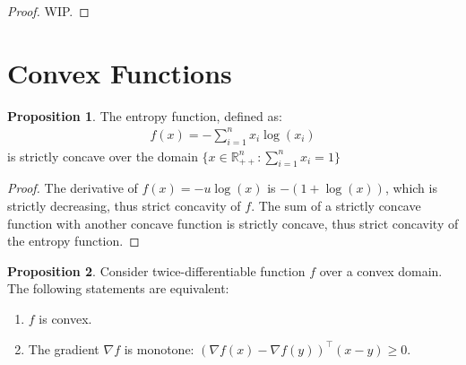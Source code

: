 \documentclass[12pt]{article}
\newcommand{\RR}{\mathbb{R}}
\theoremstyle{definition}
\newtheorem{prop}{Proposition}[section]
\begin{document}
	\begin{proof}
		WIP.
	\end{proof}
	
	\section{Convex Functions}
	
	\begin{prop}
		The entropy function, defined as:
		\begin{gather*}
			f(x) = -\sum^n_{i=1} x_i \log(x_i)
		\end{gather*}
		is strictly concave over the domain $\{x \in \RR^n_{++}: \sum^n_{i=1}x_i = 1\}$
	\end{prop}
	
	\begin{proof}
		The derivative of $f(x) = -u\log(x)$ is $-(1 + \log(x))$, which is strictly decreasing, thus strict concavity of $f$. The sum of a strictly concave function with another concave function is strictly concave, thus strict concavity of the entropy function.
	\end{proof}
	
	\begin{prop}
		Consider twice-differentiable function $f$ over a convex domain. The following statements are equivalent:
		\begin{enumerate}
			\item $f$ is convex.
			\item The gradient $\nabla f$ is monotone: $(\nabla f(x) - \nabla f(y))^\top (x - y) \geq 0$.
		\end{enumerate}
	\end{prop}
	
\end{document}
